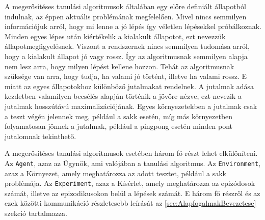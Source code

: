 A megerősítéses tanulási algoritmusok általában egy előre definiált állapotból indulnak, az éppen aktuális problémának megfelelően. Mivel nincs semmilyen információjuk arról, hogy mi lenne a jó lépés így véletlen lépésekkel próbálkoznak. Minden egyes lépes után kiértékelik a kialakult állapotot, ezt nevezzük állapotmegfigyelésnek. Viszont a rendszernek nincs semmilyen tudomása arról, hogy a kialakult állapot jó vagy rossz. Így az algoritmusnak semmilyen alapja nem lesz arra, hogy milyen lépést kellene hozzon. Tehát az algoritmusnak szüksége van arra, hogy tudja, ha valami jó történt, illetve ha valami rossz. E miatt az egyes állapotokhoz különböző jutalmakat rendelnek. A jutalmak adása kezdetben valamilyen becsélés alapján történik a jövőre nézve, ezt nevezik a jutalmak hosszútávú maximalizációjának. Egyes környezetekben a jutalmak csak a teszt végén jelennek meg, például a sakk esetén, míg más környezetben folyamatosan jönnek a jutalmak, például a pingpong esetén minden pont jutalomnak tekinthető.

A megerősítéses tanulási algoritmusok esetében három fő részt lehet elkülöníteni. Az \texttt{Agent}, azaz az Ügynök, ami valójában a tanulási algoritmus. Az \texttt{Environment}, azaz a Környezet, amely meghatározza az adott tesztet, például a sakk problémája. Az \texttt{Experiment}, azaz a Kísérlet, amely meghatározza az epizódosok számát, illetve az epizodikusokon belül a lépések számát. E három fő részről és az ezek közötti kommunikáció részletesebb leírását az \ref{sec:AlapfogalmakBevezetese} szekció tartalmazza.

